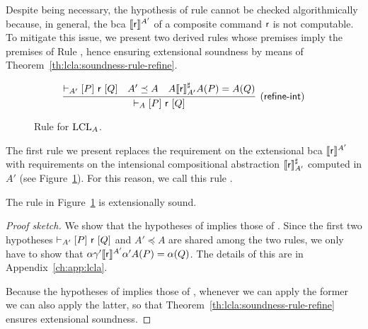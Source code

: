 Despite being necessary, the hypothesis of rule  cannot be checked algorithmically because, in general, the bca $\llbracket\mathsf{r}\rrbracket^{A'}$ of a composite command $\mathsf{r}$ is not computable. To mitigate this issue, we present two derived rules whose premises imply the premises of Rule , hence ensuring extensional soundness by means of Theorem~\ref{th:lcla:soundness-rule-refine}.

\begin{figure*}[t]
	\begin{framed}
		\[
		\infer[\lclrule{refine\mbox{-}int}]
		{\lcl{A}{P}{\regr}{Q}}
		{\lcl{A'}{P}{\regr}{Q} \quad A' \preceq A \quad A \denot{\regr}^{\sharp}_{A'} A(P) = A(Q) }		
		\]
	\end{framed}
	\vspace{-1ex}
	\caption{Rule  for $\text{LCL}_A$.}\label{fig:lcla:rule-refine-int}
\end{figure*}


The first rule we present replaces the requirement on the extensional bca $\llbracket\mathsf{r}\rrbracket^{A'}$ with requirements on the intensional compositional abstraction $\llbracket\mathsf{r}\rrbracket^{\sharp}_{A'}$ computed in $A'$ (see Figure~\ref{fig:lcla:rule-refine-int}). For this reason, we call this rule .

\begin{prop}\label{th:lcla:refine-int-sound}
	The rule  in Figure~\ref{fig:lcla:rule-refine-int} is extensionally sound.
\end{prop}
\begin{proof}[Proof sketch]
	We show that the hypotheses of  implies those of . Since the first two hypotheses $\vdash_{A'}\nobreak[P]~\mathsf{r}~[Q]$ and $A' \preceq A$ are shared among the two rules, we only have to show that $\alpha \gamma' \llbracket\mathsf{r}\rrbracket^{A'} \alpha' A(P) = \alpha(Q)$. The details of this are in Appendix~\ref{ch:app:lcla}.
	
	Because the hypotheses of  implies those of , whenever we can apply the former we can also apply the latter, so that Theorem~\ref{th:lcla:soundness-rule-refine} ensures extensional soundness.
\end{proof}

